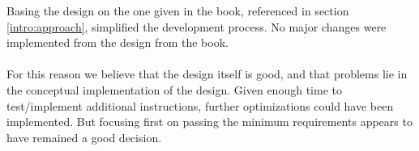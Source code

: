 Basing the design on the one given in the book, referenced in section
\ref{intro:approach}, simplified the development process. No major changes were
implemented from the design from the book.
\paragraph*{}
For this reason we believe that the design itself is good, and that problems lie
in the conceptual implementation of the design. Given enough time to
test/implement additional instructions, further optimizations could have been
implemented. But focusing first on passing the minimum requirements appears to
have remained a good decision.